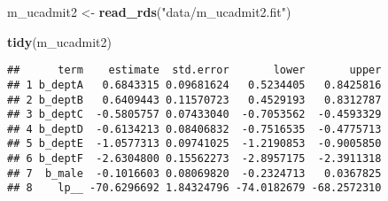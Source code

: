 \documentclass[]{article}
\newenvironment{Shaded}{\begin{snugshade}}{\end{snugshade}}
\newcommand{\KeywordTok}[1]{\textcolor[rgb]{0.13,0.29,0.53}{\textbf{#1}}}
\newcommand{\DataTypeTok}[1]{\textcolor[rgb]{0.13,0.29,0.53}{#1}}
\newcommand{\DecValTok}[1]{\textcolor[rgb]{0.00,0.00,0.81}{#1}}
\newcommand{\StringTok}[1]{\textcolor[rgb]{0.31,0.60,0.02}{#1}}
\newcommand{\OperatorTok}[1]{\textcolor[rgb]{0.81,0.36,0.00}{\textbf{#1}}}
\newcommand{\NormalTok}[1]{#1}
\begin{document}
\begin{Shaded}
\begin{Highlighting}[]
\NormalTok{m_ucadmit2 <-}\StringTok{ }\KeywordTok{read_rds}\NormalTok{(}\StringTok{"data/m_ucadmit2.fit"}\NormalTok{)}
\end{Highlighting}
\end{Shaded}

\begin{Shaded}
\begin{Highlighting}[]
\KeywordTok{tidy}\NormalTok{(m_ucadmit2)}
\end{Highlighting}
\end{Shaded}

\begin{verbatim}
##      term    estimate  std.error       lower       upper
## 1 b_deptA   0.6843315 0.09681624   0.5234405   0.8425816
## 2 b_deptB   0.6409443 0.11570723   0.4529193   0.8312787
## 3 b_deptC  -0.5805757 0.07433040  -0.7053562  -0.4593329
## 4 b_deptD  -0.6134213 0.08406832  -0.7516535  -0.4775713
## 5 b_deptE  -1.0577313 0.09741025  -1.2190853  -0.9005850
## 6 b_deptF  -2.6304800 0.15562273  -2.8957175  -2.3911318
## 7  b_male  -0.1016603 0.08069820  -0.2324713   0.0367825
## 8    lp__ -70.6296692 1.84324796 -74.0182679 -68.2572310
\end{verbatim}

\begin{Shaded}
\end{Shaded}
\end{document}
